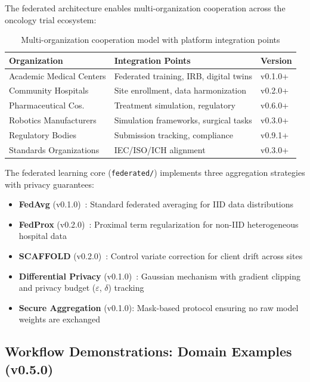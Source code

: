 \documentclass[10pt]{article}
\begin{document}
The federated architecture enables multi-organization cooperation across the oncology trial ecosystem:

\begin{table}[H]
\centering
\caption{Multi-organization cooperation model with platform integration points}
\label{tab:cooperation}
\small
\begin{tabular}{@{}p{3.2cm}p{3.8cm}l@{}}
\toprule
\textbf{Organization} & \textbf{Integration Points} & \textbf{Version} \\
\midrule
Academic Medical Centers & Federated training, IRB, digital twins & v0.1.0+ \\
Community Hospitals & Site enrollment, data harmonization & v0.2.0+ \\
Pharmaceutical Cos. & Treatment simulation, regulatory & v0.6.0+ \\
Robotics Manufacturers & Simulation frameworks, surgical tasks & v0.3.0+ \\
Regulatory Bodies & Submission tracking, compliance & v0.9.1+ \\
Standards Organizations & IEC/ISO/ICH alignment & v0.3.0+ \\
\bottomrule
\end{tabular}
\end{table}

The federated learning core (\texttt{federated/}) implements three aggregation strategies with privacy guarantees:
\begin{itemize}
  \item \textbf{FedAvg} (v0.1.0)~\cite{mcmahan2017fedavg}: Standard federated averaging for IID data distributions
  \item \textbf{FedProx} (v0.2.0)~\cite{li2020fedprox}: Proximal term regularization for non-IID heterogeneous hospital data
  \item \textbf{SCAFFOLD} (v0.2.0)~\cite{karimireddy2020scaffold}: Control variate correction for client drift across sites
  \item \textbf{Differential Privacy} (v0.1.0)~\cite{dwork2014dp}: Gaussian mechanism with gradient clipping and privacy budget ($\varepsilon$, $\delta$) tracking
  \item \textbf{Secure Aggregation} (v0.1.0): Mask-based protocol ensuring no raw model weights are exchanged
\end{itemize}

\subsection{Workflow Demonstrations: Domain Examples (v0.5.0)}
\label{sec:examples}
\end{document}
